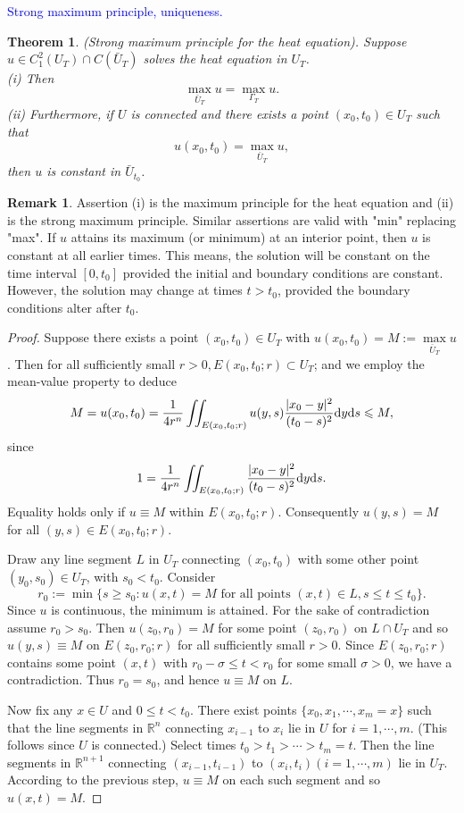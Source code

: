 \documentclass[hyperref,UTF8,12pt]{article}
\numberwithin{equation}{subsection}
\theoremstyle{plain}
\newtheorem{theorem}{Theorem}
\theoremstyle{definition}
\newtheorem{remark}{Remark}
\numberwithin{theorem}{section}
\numberwithin{lemma}{section}
\numberwithin{proposition}{section}
\numberwithin{remark}{section}
\numberwithin{corollary}{section}
\numberwithin{definition}{section}
\numberwithin{problem}{section}
\numberwithin{example}{section}
\def\dif{\textup{d}}
\newcommand{\mr}{\mathbb{R}}
\renewcommand{\leq}{\leqslant}
\renewcommand{\geq}{\geqslant}
\begin{document}
\noindent\textcolor{blue}{Strong maximum principle, uniqueness.}
\begin{theorem}\label{thm2.20}
(Strong maximum principle for the heat equation). Suppose $u\in C_1^2(U_T)\cap C(\bar{U}_T)$ solves the heat equation in $U_T$.\\
\textup{(i)} Then\[\max_{\bar{U}_T}u=\max_{\Gamma_T}u.\]
\textup{(ii)} Furthermore, if $U$ is connected and there exists a point $(x_0,t_0)\in U_T$ such that\[u(x_0,t_0)=\max_{\bar{U}_T}u,\]
then $u$ is constant in $\bar{U}_{t_0}$.
\end{theorem}
\begin{remark}
Assertion (i) is the maximum principle for the heat equation and (ii) is the strong maximum principle. Similar assertions are valid with "min" replacing "max". If $u$ attains its maximum (or minimum) at an interior point, then $u$ is constant at all earlier times. This means, the solution will be constant on the time interval $[0,t_0]$ provided the initial and boundary conditions are constant. However, the solution may change at times $t>t_0$, provided the boundary conditions alter after $t_0$.
\end{remark}
\begin{proof}
Suppose there exists a point $(x_0,t_0)\in U_T$ with $u(x_0,t_0)=M:=\max\limits_{\bar{U}_T}u$. Then for all sufficiently small $r>0,E(x_0, t_0;r)\subset U_T$; and we employ the mean-value property to deduce
\[M=u(x_0,t_0)=\frac{1}{4r^n}\iint_{E(x_0,t_0;r)}u(y,s)\frac{|x_0-y|^2}{(t_0-s)^2}\dif y\dif s\leq M,\]since\[1=\frac{1}{4r^n}\iint_{E(x_0,t_0;r)}\frac{|x_0-y|^2}{(t_0-s)^2}\dif y\dif s.\]Equality holds only if $u\equiv M$ within $E(x_0,t_0;r)$. Consequently $u(y,s)=M$ for all $(y,s)\in E(x_0,t_0;r)$.

Draw any line segment $L$ in $U_T$ connecting $(x_0,t_0)$ with some other point $(y_0, s_0)\in U_T$, with $s_0<t_0$. Consider\[r_0:=\min\{s\geq s_0:u(x,t)=
M \text{ for all points }(x, t)\in L,s\leq t\leq t_0\}.\]Since $u$ is continuous, the minimum is attained. For the sake of contradiction assume $r_0>s_0$. Then $u(z_0,r_0)=M$ for some point $(z_0,r_0)$ on $L\cap U_T$ and so $u(y,s)\equiv M$ on $E(z_0,r_0;r)$ for all sufficiently small $r>0$. Since $E(z_0,r_0;r)$ contains some point $(x,t)$ with $r_0-\sigma\leq t<r_0$ for some small $\sigma>0$, we have a contradiction. Thus $r_0=s_0$, and hence $u\equiv M$ on $L$.

Now fix any $x\in U$ and $0\leq t<t_0$. There exist points $\{x_0,x_1,\cdots,x_m=x\}$ such that the line segments in $\mr^n$ connecting $x_{i-1}$ to $x_i$ lie in $U$ for $i=1, \cdots,m$. (This follows since  $U$ is connected.) Select times $t_0>t_1>\cdots>t_m=t$. Then the line segments in $\mr^{n+1}$ connecting $(x_{i-1},t_{i-1})$ to $(x_i,t_i)(i=1,\cdots, m)$ lie in $U_T$. According to the previous step, $u\equiv M$ on each such segment and so $u(x,t)=M$.
\end{proof}
\end{document}
